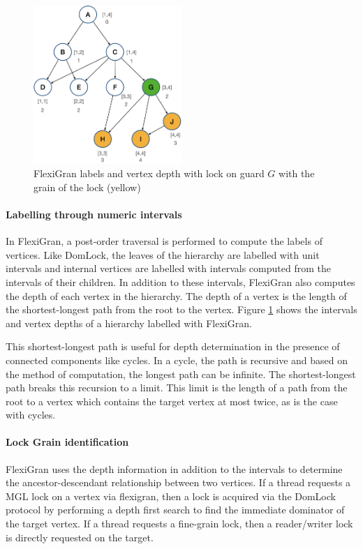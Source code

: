 \begin{figure}
    \centering
    \captionsetup{justification=centering}
    \includegraphics[width=0.5\textwidth]{figures/flexigran_example_with_lock.png}
    \caption{FlexiGran labels and vertex depth with lock on guard $G$ with the grain of the lock (yellow)}
    \label{fig:flexigran_example_locked}
\end{figure}

\paragraph{Labelling through numeric intervals}
In FlexiGran, a post-order traversal is performed to compute the labels of vertices. Like DomLock, the leaves of the hierarchy are labelled with unit intervals and internal vertices are labelled with intervals computed from the intervals of their children. In addition to these intervals, FlexiGran also computes the depth of each vertex in the hierarchy. The depth of a vertex is the length of the shortest-longest path from the root to the vertex. Figure \ref{fig:flexigran_example_locked} shows the intervals and vertex depths of a hierarchy labelled with FlexiGran.

This shortest-longest path is useful for depth determination in the presence of connected components like cycles. In a cycle, the path is recursive and based on the method of computation, the longest path can be infinite. The shortest-longest path breaks this recursion to a limit. This limit is the length of a path from the root to a vertex which contains the target vertex at most twice, as is the case with cycles. 

\paragraph{Lock Grain identification}
FlexiGran uses the depth information in addition to the intervals to determine the ancestor-descendant relationship between two vertices. 
If a thread requests a MGL lock on a vertex via flexigran, then a lock is acquired via the DomLock protocol by performing a depth first search to find the immediate dominator of the target vertex.
If a thread requests a fine-grain lock, then a reader/writer lock is directly requested on the target. 

